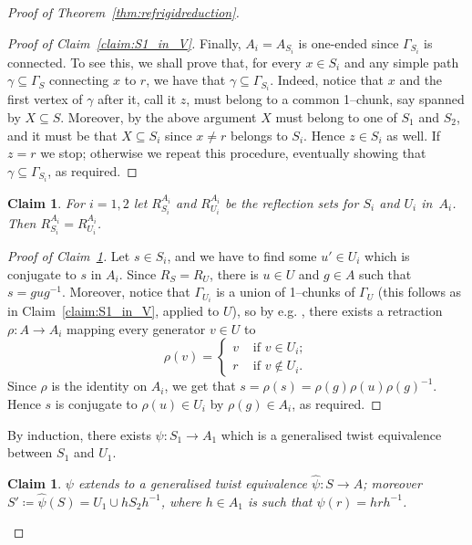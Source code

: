 \documentclass[svgnames]{amsart}
\theoremstyle{plain}
\newtheorem{claim}[thm]{Claim}
\theoremstyle{definition}
\newenvironment{claimproof}{\renewcommand{\qedsymbol}{$\blacksquare$}\begin{proof}}{\end{proof}}
\begin{document}
\begin{proof}[Proof of Theorem~\ref{thm:refrigidreduction}]
\begin{claimproof}[Proof of Claim~\ref{claim:S1_in_V}]
        Finally, $A_i=A_{S_i}$ is one-ended since $\Gamma_{S_i}$ is connected. To see this, we shall prove that, for every $x\in S_i$ and any simple path  $\gamma\subseteq \Gamma_S$ connecting $x$ to $r$, we have that $\gamma\subseteq \Gamma_{S_i}$. Indeed, notice that $x$ and the first vertex of $\gamma$ after it, call it $z$, must belong to a common 1--chunk, say spanned by $X\subseteq S$. Moreover, by the above argument $X$ must belong to one of $S_1$ and $S_2$, and it must be that $X\subseteq S_i$ since $x\neq r$ belongs to $S_i$. Hence $z\in S_i$ as well. If $z=r$ we stop; otherwise we repeat this procedure, eventually showing that $\gamma\subseteq \Gamma_{S_i}$, as required.
    \end{claimproof}
    
    \begin{claim}\label{claim:reflections_in_chunk}
       For $i=1,2$ let $R_{S_i}^{A_i}$ and $R_{U_i}^{A_i}$ be the reflection sets for $S_i$ and $U_i$ in~$A_i$. Then $R_{S_i}^{A_i}=R_{U_i}^{A_i}$.
    \end{claim} 

    \begin{claimproof}[Proof of Claim~\ref{claim:reflections_in_chunk}]
    Let $s\in S_i$, and we have to find some $u'\in U_i$ which is conjugate to $s$ in $A_i$. Since $R_S=R_U$, there is $u\in U$ and $g\in A$ such that $s=gug^{-1}$. Moreover, notice that $\Gamma_{U_i}$ is a union of 1--chunks of $\Gamma_U$ (this follows as in Claim~\ref{claim:S1_in_V}, applied to $U$), so by e.g. \cite[Remark 3.6]{JonManSar_JSJSpl}, there exists a retraction $\rho\colon A\to A_i$ mapping every generator $v\in U$ to
    $$\rho(v)=\begin{cases}
        v&\mbox{ if }v\in U_i;\\
        r&\mbox{ if }v\not \in U_i.
    \end{cases}$$
    Since $\rho$ is the identity on $A_i$, we get that $s=\rho(s)=\rho(g)\rho(u)\rho(g)^{-1}$. Hence $s$ is conjugate to $\rho(u)\in U_i$ by $\rho(g)\in A_i$, as required.
    \end{claimproof}
    \noindent By induction, there exists $\psi: S_1 \rightarrow A_1$ which is a generalised twist equivalence between $S_1$ and $U_1$.

    \begin{claim}\label{claim:hatpsi}
        $\psi$ extends to a generalised twist equivalence $\hat\psi\colon S\to A$; moreover $S'\coloneq\hat\psi(S)=U_1\cup hS_2h^{-1}$, where $h\in A_1$ is such that $\psi(r)=hrh^{-1}$.
    \end{claim}


\end{proof}
\end{document}
